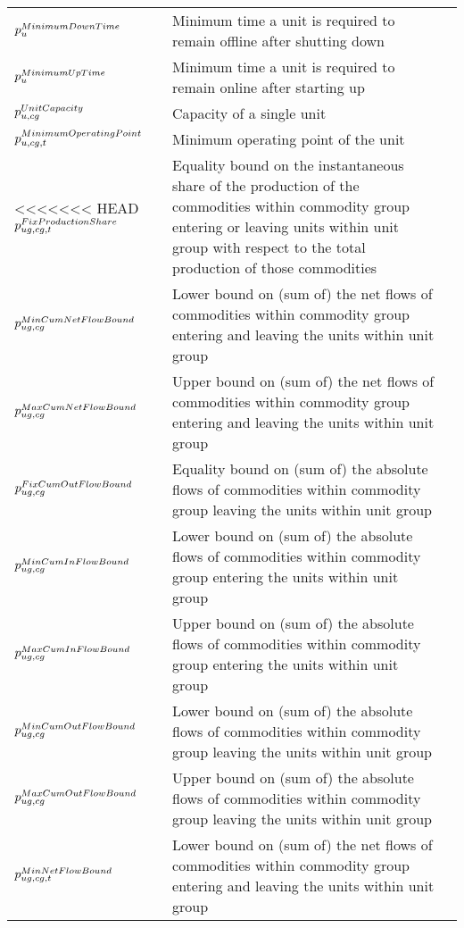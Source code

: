 \begin{longtable}{p{\cola} p{\colc} >{\small\raggedleft\arraybackslash\itshape}p{\colb}}
		$p^{MinimumDownTime}_{u}$	& Minimum time a unit is required to remain offline after shutting down	&                \\
		$p^{MinimumUpTime}_{u}$	& Minimum time a unit is required to remain online after starting up	&                \\
		$p^{UnitCapacity}_{u,cg} $	& Capacity of a single unit                                   	&                \\
		$p^{MinimumOperatingPoint}_{u,cg,t}$	& Minimum operating point of the unit                         	&                \\
<<<<<<< HEAD
		$p^{FixProductionShare}_{ug,cg,t}$	& Equality bound on the instantaneous share of the production of the commodities within commodity group \commoditygroup entering or leaving units within unit group \unitgroup with respect to the total production of those commodities	&                \\
		$p^{MinCumNetFlowBound}_{ug,cg}$	& Lower bound on (sum of) the net flows of commodities within commodity group \commoditygroup entering and leaving the units within unit group \unitgroup 	&                \\
		$p^{MaxCumNetFlowBound}_{ug,cg}$	& Upper bound on (sum of) the net flows of commodities within commodity group \commoditygroup entering and leaving the units within unit group \unitgroup 	&                \\
		$p^{FixCumOutFlowBound}_{ug,cg}$	& Equality bound on (sum of) the absolute flows of commodities within commodity group \commoditygroup leaving the units within unit group \unitgroup 	&                \\
		$p^{MinCumInFlowBound}_{ug,cg}$	& Lower bound on (sum of) the absolute flows of commodities within commodity group \commoditygroup entering the units within unit group \unitgroup 	&                \\
		$p^{MaxCumInFlowBound}_{ug,cg}$	& Upper bound on (sum of) the absolute flows of commodities within commodity group \commoditygroup entering the units within unit group \unitgroup 	&                \\
		$p^{MinCumOutFlowBound}_{ug,cg}$	& Lower bound on (sum of) the absolute flows of commodities within commodity group \commoditygroup leaving the units within unit group \unitgroup 	&                \\
		$p^{MaxCumOutFlowBound}_{ug,cg}$	& Upper bound on (sum of) the absolute flows of commodities within commodity group \commoditygroup leaving the units within unit group \unitgroup 	&                \\
		$p^{MinNetFlowBound}_{ug,cg,t}$	& Lower bound on (sum of) the net flows of commodities within commodity group \commoditygroup entering and leaving the units within unit group \unitgroup 	&                \\

\end{longtable}
